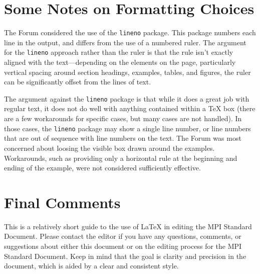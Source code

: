\documentclass[letterpaper,twoside,11pt,fleqn]{article}
\def\MPI/{\textsf{MPI}}    %
\begin{document}
\section{Some Notes on Formatting Choices}
\label{sec:other-choices}
The Forum considered the use of the \texttt{lineno} package.
This package numbers each line in the output, and differs from the use
of a numbered ruler.
The argument for the \texttt{lineno} approach rather than the ruler is
that the rule isn't exactly aligned with the text---depending on the
elements on the page, particularly vertical spacing around section
headings, examples, tables, and figures, the ruler can be
significantly offset from the lines of text.

The argument against the \texttt{lineno} package is that while it does
a great job with regular text, it does not do well with anything
contained within a TeX box (there are a few workarounds for specific
cases, but many cases are not handled). In those cases, the
\texttt{lineno} package may show a single line number, or line numbers
that are out of sequence with line numbers on the text.
The Forum was most concerned about loosing the visible box drawn
around the examples.
Workarounds, such as providing only a horizontal rule at the beginning
and ending of the example, were not considered sufficiently effective.

\section{Final Comments}
\label{sec:final}
This is a relatively short guide to the use of LaTeX in editing the
\MPI/ Standard Document.
Please contact the editor if you have any questions, comments, or
suggestions about either this document or on the editing process for
the \MPI/ Standard Document.
Keep in mind that the goal is clarity and precision in the document,
which is aided by a clear and consistent style.
\end{document}
